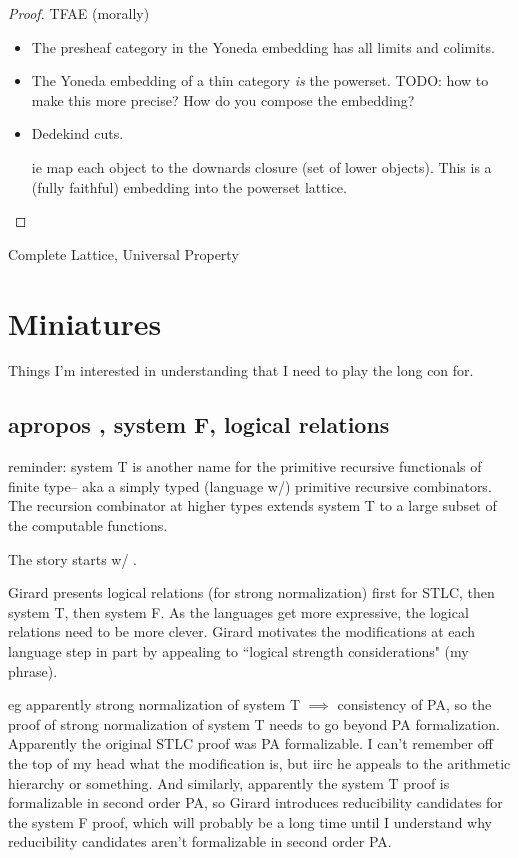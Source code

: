 \documentclass[
	fontsize=10pt, %
	twoside=false, %
	secnumdepth=-1, %
]{kaobook}
\theoremstyle{break}
\begin{document}
    \begin{proof}
        TFAE (morally)
        \begin{itemize}
            \item The presheaf category in the Yoneda embedding has all limits and colimits.
            \item The Yoneda embedding of a thin category \emph{is} the powerset. TODO: how to make this more precise? How do you compose the embedding?
            \item Dedekind cuts.
                
            ie map each object to the downards closure (set of lower objects).
            This is a (fully faithful) embedding into the powerset lattice.
        \end{itemize}
    \end{proof}

    \See Complete Lattice, Universal Property
\chapter{Miniatures}
    Things I'm interested in understanding
    that I need to play the long con for.
    \section{apropos , system F, logical relations}
        reminder: system T is another name for the primitive recursive functionals of finite type--
        aka a simply typed (language w/) primitive recursive combinators.
        The recursion combinator at higher types extends system T
        to a large subset of the computable functions.

        The story starts w/ .

        Girard presents logical relations (for strong normalization)
        first for STLC, then system T, then system F.
        As the languages get more expressive,
        the logical relations need to be more clever.
        Girard motivates the modifications at each language step
        in part by appealing to ``logical strength considerations" (my phrase).

        eg apparently strong normalization of system T $⟹$ consistency of PA,
        so the proof of strong normalization of system T needs to go beyond PA formalization.
        Apparently the original STLC proof was PA formalizable.
        I can't remember off the top of my head what the modification is,
        but iirc he appeals to the arithmetic hierarchy or something.
        And similarly, apparently the system T proof is formalizable
        in second order PA,
        so Girard introduces reducibility candidates for the system F proof,
        which will probably be a long time until I understand why reducibility candidates
        aren't formalizable in second order PA.
\end{document}

